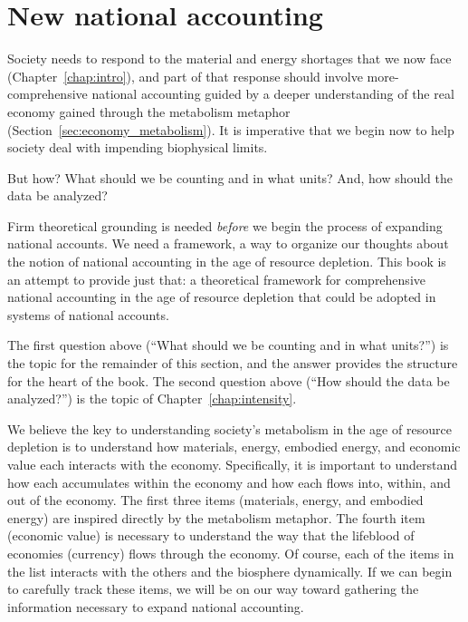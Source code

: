 \section{New national accounting}
\label{sec:new_national_accounting}

Society needs to respond 
to the material and energy shortages that
we now face (Chapter~\ref{chap:intro}),
and part of that response
should involve more-comprehensive national accounting 
guided by a deeper understanding of the real economy 
gained through the metabolism metaphor (Section~\ref{sec:economy_metabolism}).
It is imperative that we begin now
to help society deal with impending biophysical limits.

But how? 
What should we be counting and in what units?
And, how should the data be analyzed?

Firm theoretical grounding is needed 
\emph{before} we begin the process of expanding national accounts.
We need a framework, a way to organize our thoughts about the notion 
of national accounting in the age of resource depletion.
This book is an attempt to provide just that: 
a theoretical framework
for comprehensive national accounting
in the age of resource depletion
that could be adopted in systems of national accounts.

The first question above (``What should we be counting and in what units?'') 
is the topic for the remainder of this section,
and the answer provides the structure for the heart of the book.
The second question above (``How should the data be analyzed?'')
is the topic of Chapter~\ref{chap:intensity}.

We believe the key to understanding society's metabolism
in the age of resource depletion is to understand how 
materials, energy, embodied energy, and economic value
each interacts with the economy.
Specifically, it is important to understand how each
accumulates within the economy and how each flows into, within, and out of the economy.
The first three items (materials, energy, and embodied energy) are
inspired directly by the metabolism metaphor.
The fourth item (economic value) is necessary to understand the way 
that the lifeblood of economies (currency) flows through the economy.
Of course, each of the items in the list interacts with the others 
and the biosphere dynamically.
If we can begin to carefully track these items, 
we will be on our way toward gathering the information necessary to 
expand national accounting.

